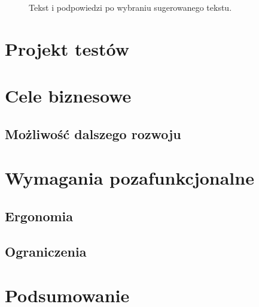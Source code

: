\documentclass[twoside,a4paper]{book}
\begin{document}
\begin{figure}[!h]
		\centering
		\caption{Tekst i podpowiedzi po wybraniu sugerowanego tekstu. }
		\label{fig:add}
\end{figure}
\section{Projekt testów}


\section{Cele biznesowe}
\subsection{Możliwość dalszego rozwoju}
\section{Wymagania pozafunkcjonalne}

\subsection{Ergonomia}
\subsection{Ograniczenia}
\section{Podsumowanie}
\end{document}
